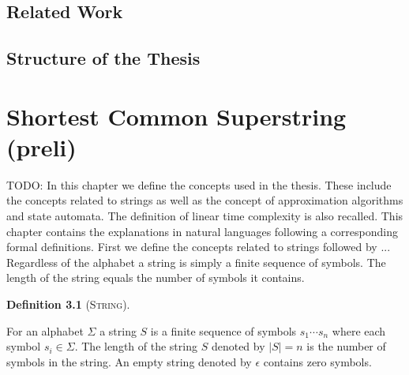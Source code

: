 \documentclass[english,twoside,censored,csm,algorithms-track-2020]{HYthesisML}
\theoremstyle{plain}
\theoremstyle{definition}
\newtheorem{definition}[equation]{Definition}
\begin{document}
  

  \section{Related Work}



  
  \section{Structure of the Thesis}

\chapter {Shortest Common Superstring (preli)}








TODO:
In this chapter we define the concepts used in the thesis. These include the concepts related to
strings as well as the concept of approximation algorithms and state automata. The definition of
linear time complexity is also recalled. This chapter contains the explanations in natural
languages following a corresponding formal definitions. First we define the concepts related
to strings followed by ...  \\[1in]



Regardless of the alphabet a string is simply a finite sequence of symbols. The length of the string equals the number of symbols it contains. 

\begin{definition}[\textsc{String}]~\label{def-string}
  
  For an alphabet $\Sigma$ a string $S$ is a finite sequence of symbols  ${s_1\cdots s_n}$ where each symbol $s_i \in \Sigma$.
  The length of the string $S$ denoted by $|S| = n$ is the number of symbols in the string.
  An empty string denoted by $\epsilon$ contains zero symbols.
  
\end{definition}
\end{document}

